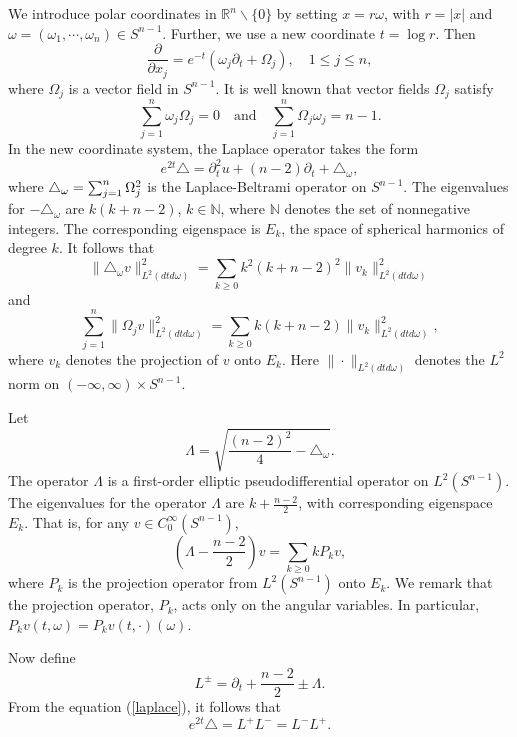 \documentclass[11pt]{amsart}
\theoremstyle{plain}
\numberwithin{equation}{section}
\begin{document}
We introduce polar coordinates in $\mathbb R^n\backslash \{0\}$ by setting $x=r\omega$, with $r=|x|$ and $\omega=(\omega_1,\cdots,\omega_n)\in S^{n-1}$.
Further, we use a new coordinate $t=\log r$.
Then
$$ \frac{\partial }{\partial x_j}=e^{-t}(\omega_j\partial_t+  \Omega_j), \quad 1\leq j\leq n, $$
where $\Omega_j$ is a vector field in $S^{n-1}$.
It is well known that vector fields $\Omega_j$ satisfy
$$ \sum^{n}_{j=1}\omega_j\Omega_j=0 \quad \mbox{and} \quad
\sum^{n}_{j=1}\Omega_j\omega_j=n-1.$$
In the new coordinate system, the Laplace operator takes the form
\begin{equation}
e^{2t} \triangle=\partial^2_t u+(n-2)\partial_t+\triangle_{\omega},
\label{laplace}
\end{equation}
where ${\displaystyle} \triangle_\omega=\sum_{j=1}^n \Omega^2_j$ is the Laplace-Beltrami operator on $S^{n-1}$.
The eigenvalues for $-\triangle_\omega$ are $k(k+n-2)$, $k\in \mathbb{N}$, where $\mathbb{N}$ denotes the set of nonnegative integers.
The corresponding eigenspace is $E_k$, the space of spherical harmonics of degree $k$.
It follows that
$$\| \triangle_\omega v\|^2_{L^2(dtd\omega)}=\sum_{k\geq 0} k^2(k+n-2)^2\| v_k\|^2_{L^2(dtd\omega)}$$
and
\begin{equation}
\sum_{j=1}^n\| \Omega_j v\|^2_{L^2(dtd\omega)}
=\sum_{k\geq 0} k(k+n-2)\|v_k\|^2_{L^2(dtd\omega)},
\label{lll}
\end{equation}
where $v_k$ denotes the projection of $v$ onto $E_k$.
Here $\|\cdot\|_{L^2(dtd\omega)}$ denotes the $L^2$ norm on $(-\infty, \infty)\times S^{n-1}$.

 Let
$$\Lambda=\sqrt{\frac{(n-2)^2}{4}-\triangle_\omega}.$$ The operator $\Lambda$ is a
first-order elliptic pseudodifferential operator on $L^2(S^{n-1})$.
The eigenvalues for the operator $\Lambda$ are $k+\frac{n-2}{2}$, with corresponding eigenspace $E_k$.
That is, for any $v\in C^\infty_0(S^{n-1})$,
\begin{equation}
{\left( {\Lambda - \frac{n-2}{2}} \right) } v= \sum_{k\geq 0}k P_k v,
\label{ord}
\end{equation}
where $P_k$ is the projection operator from $L^2(S^{n-1})$ onto $E_k$.
We remark that the projection operator, $P_k$, acts only on the angular variables.
In particular, $P_k v{\left( {t, {\omega}} \right) } = P_k v{\left( {t, \cdot} \right) } {\left( {\omega} \right) }$.

Now define
\begin{equation} L^\pm=\partial_t+\frac{n-2}{2}\pm \Lambda.
\label{use}
\end{equation} From the equation (\ref{laplace}), it follows that
\begin{equation*}
e^{2t} \triangle=L^+L^-=L^-L^+.
\end{equation*}
\end{document}
